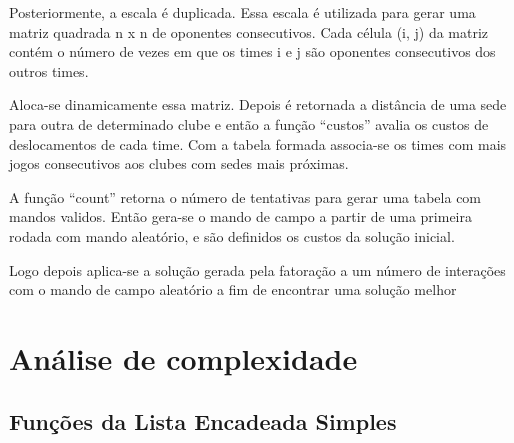 \documentclass[12pt,a4paper]{article}
\begin{document}
Posteriormente, a escala é duplicada. Essa escala é utilizada para gerar uma matriz quadrada n x n de oponentes consecutivos. Cada célula (i, j) da matriz contém o número de vezes em que os times i e j são oponentes consecutivos dos outros times.

Aloca-se dinamicamente essa matriz. Depois é retornada a distância de uma sede para outra de determinado clube e então a função “custos” avalia os custos de deslocamentos de cada time. Com a tabela formada associa-se os times com mais jogos consecutivos aos clubes com sedes mais próximas. 

A função “count” retorna o número de tentativas para gerar uma tabela com mandos validos. Então gera-se o mando de campo a partir de uma primeira rodada com mando aleatório, e são definidos os custos da solução inicial.

Logo depois aplica-se a solução gerada pela fatoração a um número de interações com o mando de campo aleatório a fim de encontrar uma solução melhor

\section{Análise de complexidade}

\subsection{Funções da Lista Encadeada Simples}
\end{document}
